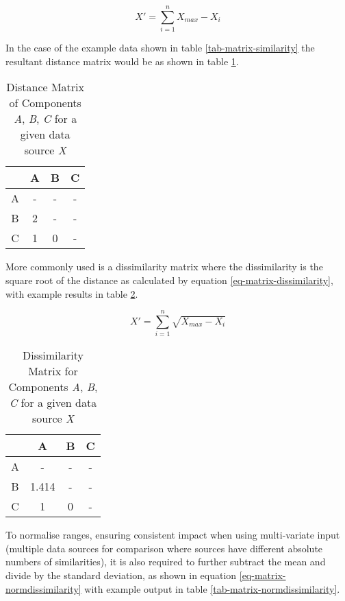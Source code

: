\begin{equation}
\label{eq-matrix-distance}
\displaystyle X' = \sum\limits_{i=1}^n X_{max} - X_i
\end{equation}

In the case of the example data shown in table \ref{tab-matrix-similarity} the resultant distance matrix would be as shown in table \ref{tab-matrix-distance}.

\begin{table}[H]
\centering
\begin{tabular}{| c || c | c | c |}
\hline
 & A & B & C \\ \hline \hline
A & - & - & - \\
B & 2 & - & - \\ 
C & 1 & 0 & - \\ 
\hline
\end{tabular}
\caption{Distance Matrix of Components \textit{A}, \textit{B}, \textit{C} for a given data source \textit{X}}
\label{tab-matrix-distance}
\end{table}

More commonly used is a dissimilarity matrix where the dissimilarity is the square root of the distance as calculated by equation \ref{eq-matrix-dissimilarity}, with example results in table \ref{tab-matrix-dissimilarity}.

\begin{equation}
\label{eq-matrix-dissimilarity}
\displaystyle X' = \sum\limits_{i=1}^n \sqrt{X_{max} - X_i}
\end{equation}

\begin{table}[H]
\centering
\begin{tabular}{| c || c | c | c |}
\hline
 & A & B & C \\ \hline \hline
A & - & - & - \\
B & 1.414 & - & - \\ 
C & 1 & 0 & - \\ 
\hline
\end{tabular}
\caption{Dissimilarity Matrix for Components \textit{A}, \textit{B}, \textit{C} for a given data source \textit{X}}
\label{tab-matrix-dissimilarity}
\end{table}

To normalise ranges, ensuring consistent impact when using multi-variate input (multiple data sources for comparison where sources have different absolute numbers of similarities), it is also required to further subtract the mean and divide by the standard deviation, as shown in equation \ref{eq-matrix-normdissimilarity} with example output in table \ref{tab-matrix-normdissimilarity}.

